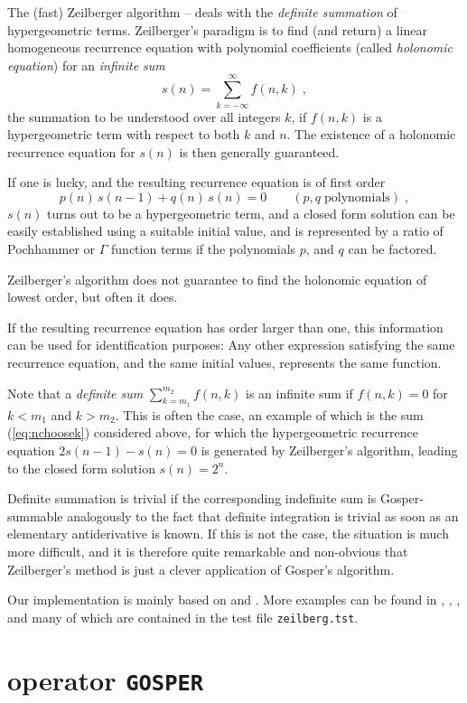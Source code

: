 The (fast) Zeilberger algorithm \cite{Zei2}--\cite{Zei3}
deals with the {\sl definite summation} of
hypergeometric terms. Zeilberger's paradigm is to find (and return)
a linear homogeneous recurrence equation with polynomial coefficients
(called {\sl holonomic equation}) for an {\sl infinite sum}
\[
s(n)=\sum_{k=-\infty}^{\infty} f(n,k)
\;,
\]
the summation to be understood over all integers $k$,
if $f(n,k)$ is a hypergeometric term with respect to both $k$ and $n$.
The existence of a holonomic recurrence equation for $s(n)$ is then
generally guaranteed.

If one is lucky, and the resulting recurrence equation is of first order
\[
p(n)\,s(n-1)+q(n)\,s(n)=0
\quad\quad(p,q\;\mbox{polynomials})
\;,
\]
$s(n)$ turns out to be a hypergeometric term, and a closed form solution
can be easily established using a suitable initial value, and is
represented by a ratio of Pochhammer or $\Gamma$ function terms if the
polynomials $p$, and $q$ can be factored.

Zeilberger's algorithm does not guarantee to find the holonomic equation
of lowest order, but often it does.

If the resulting recurrence equation has order larger than one,
this information can be used for identification purposes:
Any other expression satisfying the same recurrence equation, and the same
initial values, represents the same function.

Note that a {\sl definite sum} $\sum\limits_{k=m_1}^{m_2} f(n,k)$ is an
infinite sum if $f(n,k)=0$ for $k<m_1$ and $k>m_2$.
This is often the case, an example of which is the sum (\ref{eq:nchoosek})
considered above, for which the hypergeometric recurrence equation
$2 s(n-1) - s(n) = 0$ is generated by Zeilberger's algorithm, leading
to the closed form solution $s(n)=2^n$.

Definite summation is trivial if the corresponding indefinite sum
is Gosper-summable analogously to the fact that definite integration
is trivial as soon as an elementary antiderivative is known.  If this is
not the case, the situation is much more difficult, and it is therefore
quite remarkable and non-obvious
that Zeilberger's method is just a clever application of Gosper's algorithm.

Our implementation is mainly based on \cite{Koornwinder} and \cite{Koepf}.
More examples can be found in \cite{PS}, \cite{Strehl2}, \cite{Wil1},
and \cite{Wilf} many of which are contained in the test file
{\tt zeilberg.tst}.

\section{\REDUCE{} operator {\tt GOSPER}}

